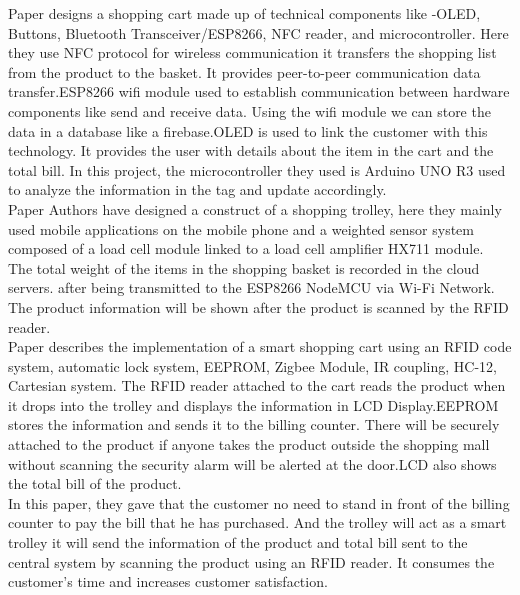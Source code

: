 \documentclass[conference]{IEEEtran}
\begin{document}
Paper\cite{b15} designs a shopping cart made up of technical components like -OLED, Buttons, Bluetooth Transceiver/ESP8266, NFC reader, and microcontroller. Here they use NFC protocol for wireless communication it transfers the shopping list from the product to the basket. It provides peer-to-peer communication data transfer.ESP8266 wifi module used to establish communication between hardware components like send and receive data. Using the wifi module we can store the data in a database like a firebase.OLED is used to link the customer with this technology. It provides the user with details about the item in the cart and the total bill. In this project, the microcontroller they used is Arduino UNO R3 used to analyze the information in the tag and update accordingly.\\


Paper\cite{b16} Authors have designed a construct of a shopping trolley, here they mainly used mobile applications on the mobile phone and a weighted sensor system composed of a load cell module linked to a load cell amplifier HX711 module. The total weight of the items in the shopping basket is recorded in the cloud servers. after being transmitted to the ESP8266 NodeMCU via Wi-Fi Network. The product information will be shown after the product is scanned by the RFID reader.\\


Paper\cite{b17} describes the implementation of a smart shopping cart using an RFID code system, automatic lock system, EEPROM, Zigbee Module, IR coupling, HC-12, Cartesian system. The RFID reader attached to the cart reads the product when it drops into the trolley and displays the information in LCD Display.EEPROM stores the information and sends it to the billing counter. There will be securely attached to the product if anyone takes the product outside the shopping mall without scanning the security alarm will be alerted at the door.LCD also shows the total bill of the product.\\





In this paper\cite{b18}, they gave that the customer no need to stand in front of the billing counter to pay the bill that he has purchased. And the trolley will act as a smart trolley it will send the information of the product and total bill sent to the central system by scanning the product using an RFID reader. It consumes the customer’s time and increases customer satisfaction.\\
\end{document}
